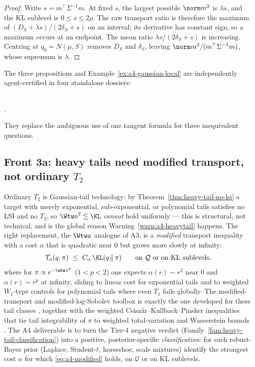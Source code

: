 \documentclass[../../main.tex]{subfiles}
\begin{document}
\begin{proof}
Write $s=m^\top\Sigma^{-1}m$. At fixed $s$, the largest possible $\norm m^2$ is $\lambda s$,
and the KL sublevel is $0\le s\le2\rho$. The raw transport ratio is therefore the maximum of
$(D_S+\lambda s)/(2\delta_S+s)$ on an interval; its derivative has constant sign, so a maximum
occurs at an endpoint. The mean ratio $\lambda s/(2\delta_S+s)$ is increasing. Centring at
$q_0=N(\mu,S)$ removes $D_S$ and $\delta_S$, leaving
$\norm m^2/(m^\top\Sigma^{-1}m)$, whose supremum is $\lambda$.
\end{proof}

The three propositions and Example~\ref{ex:a4-gaussian-local} are independently agent-certified
in four standalone dossiers:
\begin{center}\small
{}\qquad
{}\\
\qquad
{}.
\end{center}
They replace the ambiguous use of one tangent formula for three inequivalent questions.

\subsection{Front 3a: heavy tails need modified transport, not ordinary \texorpdfstring{$T_2$}{T2}}
\label{subsec:a4-modified}

Ordinary $T_2$ is Gaussian-tail technology: by Theorem~\ref{thm:heavy-tail-no-lsi} a target with
merely exponential, sub-exponential, or polynomial tails satisfies no LSI and no $T_2$, so
$\Wtwo^2\lesssim\KL$ \emph{cannot} hold uniformly --- this is structural, not technical, and is
the global reason Warning~\ref{warn:a4-heavytail} happens. The right replacement, the $\Wtwo$
analogue of A3, is a \emph{modified} transport inequality with a cost $\alpha$ that is quadratic
near $0$ but grows more slowly at infinity:
\begin{equation}\label{eq:a4-modified}
  \mathcal T_\alpha(q,\pi)\ \le\ C_\alpha\,\KL(q\,\|\,\pi)
  \qquad\text{on}\ \mathcal Q\ \text{or on KL sublevels},
\end{equation}
where for $\pi\propto e^{-\abs x^p}$ ($1<p<2$) one expects $\alpha(r)\sim r^2$ near $0$ and
$\alpha(r)\sim r^{p}$ at infinity, sliding to linear cost for exponential tails and to weighted
$W_1$-type controls for polynomial tails where even $T_1$ fails globally. The modified-transport
and modified-log-Sobolev toolbox is exactly the one developed for these tail classes
\cite{BobkovLedoux1997,GentilGuillinMiclo2005,GozlanLeonard2007}, together with the weighted
Csisz\'ar--Kullback--Pinsker inequalities that tie tail integrability of $\pi$ to weighted
total-variation and Wasserstein bounds \cite{BolleyVillani2005}. The A4 deliverable is to turn
the Tier-4 negative verdict (Family~\ref{fam:heavy-tail-classification}) into a positive,
posterior-specific \emph{classification}: for each robust-Bayes prior (Laplace, Student-$t$,
horseshoe, scale mixtures) identify the strongest cost $\alpha$ for which \eqref{eq:a4-modified}
holds, on $\mathcal Q$ or on KL sublevels.
\end{document}

